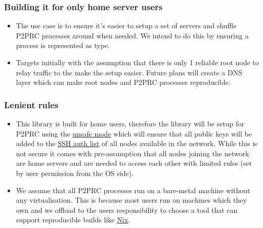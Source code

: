 \documentclass[11pt]{article}
\begin{document}
\subsubsection{Building it for only home server users}
\label{sec:orgffcf4bf}
\begin{itemize}
\item The use case is to ensure it's easier to setup a set of servers and shuffle P2PRC processes around
when needed. We intend to do this by ensuring a process is represented as type.
\item Targets initially with the assumption that there is only 1 reliable root node to relay traffic to the make the setup
easier. Future plans will create a DNS layer which can make root nodes and P2PRC processes reproducible.
\end{itemize}

\subsubsection{Lenient rules}
\label{sec:orgfdab7c9}
\begin{itemize}
\item This library is built for home users, therefore the library will be setup for P2PRC using the \href{https://github.com/Akilan1999/p2p-rendering-computation/pull/115}{unsafe mode} which will ensure that all public
keys will be added to the \href{https://www.ssh.com/academy/ssh/authorized-keys-file\#:\~:text=The\%20authorized\_keys\%20file\%20in\%20SSH,keys\%20and\%20needs\%20proper\%20management}{SSH auth list} of all nodes available in the network. While this is not secure it
comes with pre-assumption that all nodes joining the network are home servers and are needed to access each other
with limited rules (set by user permission from the OS side).
\item We assume that all P2PRC processes run on a bare-metal machine without any virtualisation.
This is because most users run on machines which they own and we offload to the users
responsibility to choose a tool that can support reproducible builds like \href{https://nixos.org/}{Nix}.
\end{itemize}
\end{document}
